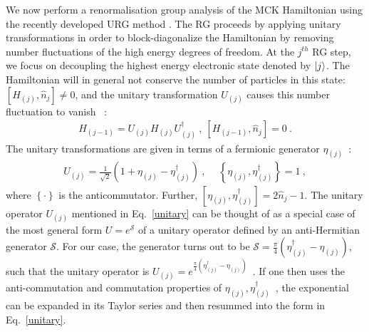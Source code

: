 \documentclass{iopart}
\begin{document}
We now perform a renormalisation group analysis of the MCK Hamiltonian using the recently developed URG method \cite{anirbanmott1,anirbanmott2,anirbanurg1,anirbanurg2,siddharthacpi,santanukagome,1dhubjhep}.
The RG proceeds {by applying unitary transformations in order to block-diagonalize the Hamiltonian by removing number fluctuations of the high energy degrees of freedom}.
At the $j^{th}$ RG step, we focus on decoupling the highest energy electronic state denoted by $\ket{j}$.
The Hamiltonian will in general not conserve the number of particles in this state: \(\left[H_{(j)}, \hat n_{j}\right] \neq 0\), and the unitary transformation \(U_{(j)}\) causes this number fluctuation to vanish
~\cite{anirbanurg1,anirbanurg2}:
\begin{eqnarray}
	H_{(j-1)} = U_{(j)} H_{(j)} U^\dagger_{(j)}~, ~\left[H_{(j-1)}, \hat n_{j}\right] =0~.
\end{eqnarray}
The unitary transformations are given in terms of a fermionic generator \(\eta_{(j)}\)~\cite{anirbanurg1,anirbanurg2}:
\begin{eqnarray}
	\label{unitary}
	U_{(j)} = \frac{1}{\sqrt 2}\left(1 + \eta_{(j)} - \eta_{(j)}^\dagger\right)~,~ \quad\left\{ \eta_{(j)},\eta_{(j)}^\dagger \right\} = 1~,
\end{eqnarray}
where \(\left\{\cdot\right\}\) is the anticommutator. Further, $\left[ \eta_{(j)},\eta_{(j)}^\dagger \right] = 2\hat n_{j}-1$. The unitary operator \(U_{(j)}\) mentioned in Eq.~\eqref{unitary} can be thought of as a special case of the most general form \(U = e^\mathcal{S}\) of a unitary operator defined by an anti-Hermitian generator \(\mathcal{S}\). For our case, the generator turns out to be \(\mathcal{S} = \frac{\pi}{4}\left( \eta^\dagger_{(j)} - \eta_{(j)} \right) \), such that the unitary operator is \(U_{(j)} = e^{\frac{\pi}{4}\left(\eta^\dagger_{(j)} - \eta_{(j)}\right) }\)~\cite{anirbanurg1}. If one then uses the anti-commutation and commutation properties of \(\eta_{(j)},\eta^\dagger_{(j)}\)~\cite{anirbanurg1,anirbanurg2}, the exponential can be expanded in its Taylor series and then resummed into the form in Eq.~\eqref{unitary}.
\end{document}
